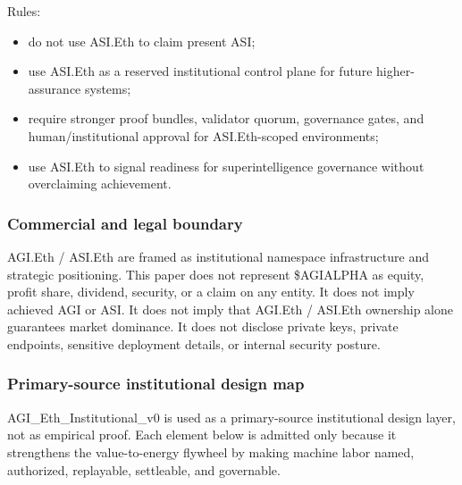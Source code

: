 \documentclass[
  11pt,
]{article}
\providecommand{\tightlist}{%
  \setlength{\itemsep}{0pt}\setlength{\parskip}{0pt}}
\begin{document}
Rules:

\begin{itemize}
\tightlist
\item
  do not use ASI.Eth to claim present ASI;
\item
  use ASI.Eth as a reserved institutional control plane for future
  higher-assurance systems;
\item
  require stronger proof bundles, validator quorum, governance gates,
  and human/institutional approval for ASI.Eth-scoped environments;
\item
  use ASI.Eth to signal readiness for superintelligence governance
  without overclaiming achievement.
\end{itemize}

\subsubsection{Commercial and legal
boundary}\label{commercial-and-legal-boundary}

AGI.Eth / ASI.Eth are framed as institutional namespace infrastructure
and strategic positioning. This paper does not represent \$AGIALPHA as
equity, profit share, dividend, security, or a claim on any entity. It
does not imply achieved AGI or ASI. It does not imply that AGI.Eth /
ASI.Eth ownership alone guarantees market dominance. It does not
disclose private keys, private endpoints, sensitive deployment details,
or internal security posture.

\subsubsection{Primary-source institutional design
map}\label{primary-source-institutional-design-map}

\begingroup\scriptsize

AGI\_Eth\_Institutional\_v0 is used as a primary-source institutional
design layer, not as empirical proof. Each element below is admitted
only because it strengthens the value-to-energy flywheel by making
machine labor named, authorized, replayable, settleable, and governable.
\end{document}
